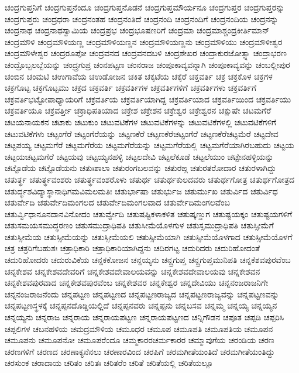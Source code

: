 {ಚಂದ್ರಗುಪ್ತನಿಗೆ
ಚಂದ್ರಗುಪ್ತನೆಂದೂ
ಚಂದ್ರಗುಪ್ತನೊಡನೆ
ಚಂದ್ರಗುಪ್ತಮೌರ್ಯನೂ
ಚಂದ್ರಗುಪ್ತರ
ಚಂದ್ರಗುಪ್ತರನ್ನು
ಚಂದ್ರಗುಪ್ತರು
ಚಂದ್ರಧರಾ
ಚಂದ್ರನಂತಹ
ಚಂದ್ರನಂತಿದೆ
ಚಂದ್ರನಂದಿ
ಚಂದ್ರನಂದಿಗೆ
ಚಂದ್ರನಂದಿಯ
ಚಂದ್ರನನ್ನು
ಚಂದ್ರನಾಥ
ಚಂದ್ರನಾಥಸ್ವಾಮಿಯ
ಚಂದ್ರಪ್ರಭ
ಚಂದ್ರಭೂಷಣರಿಗೆ
ಚಂದ್ರಮಾ
ಚಂದ್ರಮಾಶ್ಚಂದ್ರಕೀರ್ತಿಮಾನ್
ಚಂದ್ರಮೌಳಿ
ಚಂದ್ರಮೌಳಿಯಣ್ಣ
ಚಂದ್ರಮೌಳಿಯಣ್ಣನ
ಚಂದ್ರಮೌಳಿಯಣ್ಣನು
ಚಂದ್ರಮೌಳಿಯು
ಚಂದ್ರಮೌಳೀಶ್ವರ
ಚಂದ್ರಮೌಳೇಶ್ವರ
ಚಂದ್ರರೂಪೋ
ಚಂದ್ರವನದ
ಚಂದ್ರವನದಬಳಿ
ಚಂದ್ರಶೇಖರ
ಚಂದ್ರಾಕುರಜೋತ್ಸ್ನಾ
ಚಂದ್ರಾಭರಣ
ಚಂದ್ರೊಬ್ಬಲಬ್ಬೆಯನ್ನು
ಚಂದ್ರ್ರಗುಪ್ರ
ಚಂನಪಟ್ಟಣ
ಚಂನರಾಜ
ಚಂಪೂಕಾವ್ಯವನ್ನಾಗಿ
ಚಂಪೂಕಾವ್ಯವನ್ನು
ಚಂಬಲ್ಲೀಪುರ
ಚಂಬಿನ
ಚಂಮಟಿ
ಚಉಗಾವೆಯ
ಚಉಡೋಜನ
ಚಕಿತ
ಚಕ್ಕಟೆಯ
ಚಕ್ಕೆರೆ
ಚಕ್ತವರ್ತಿ
ಚಕ್ರ
ಚಕ್ರಕೊಳ
ಚಕ್ರಗಳ
ಚಕ್ರಗೊಟ್ಟ
ಚಕ್ರಗೊಟ್ಟಮು
ಚಕ್ರದ
ಚಕ್ರವರ್ತಿ
ಚಕ್ರವರ್ತಿಗಳ
ಚಕ್ರವರ್ತಿಗಳಿಗೆ
ಚಕ್ರವರ್ತಿಗಳು
ಚಕ್ರವರ್ತಿಗೆ
ಚಕ್ರವರ್ತಿಭಟ್ಟೋಪಾಧ್ಯಾಯರಿಗೆ
ಚಕ್ರವರ್ತಿಯ
ಚಕ್ರವರ್ತಿಯಾಗಿದ್ದ
ಚಕ್ರವರ್ತಿಯಾದ
ಚಕ್ರವರ್ತಿಯಿಂದ
ಚಕ್ರವರ್ತಿಯು
ಚಕ್ರವರ್ತಿಯೂ
ಚಕ್ರವರ್ತ್ತೀ
ಚಕ್ರಾಧಿಪತಿಯಾದ
ಚಕ್ರೇಶ
ಚಕ್ರೇಶನ
ಚಕ್ರೇಶ್ವರ
ಚಕ್ರೇಶ್ವರನ
ಚಕ್ಷುಷೇ
ಚಟಮಗೆರೆ
ಚಟಯನಾಯಕನ
ಚಟಾಕು
ಚಟುಕುಂ
ಚಟುವಟಿಕೆಗಳ
ಚಟುವಟಿಕೆಗಳನ್ನು
ಚಟುವಟಿಕೆಗಳಲ್ಲಿ
ಚಟುವಟಿಕೆಗಳಿಗೆ
ಚಟುವಟಿಕೆಗಳು
ಚಟ್ಟಂಗೆರೆ
ಚಟ್ಟಂಗೆರೆಯನ್ನು
ಚಟ್ಟಣಕೆರೆ
ಚಟ್ಟಣಕೆರೆಚಟ್ಟಂಗೆರೆ
ಚಟ್ಟಣಕೆರೆಚಟ್ಟಮೆರೆ
ಚಟ್ಟದೇವ
ಚಟ್ಟಪಯ್ಯ
ಚಟ್ಟಮಗೆರೆ
ಚಟ್ಟಮಗೆರೆಯ
ಚಟ್ಟಮಗೆರೆಯನ್ನು
ಚಟ್ಟಮಗೆರೆಯಲ್ಲಿ
ಚಟ್ಟಮಗೆರೆಯಾಗಿರಬಹುದು
ಚಟ್ಟಯ
ಚಟ್ಟಯಚಟ್ಟಮಗೆರೆ
ಚಟ್ಟಯವು
ಚಟ್ಟಯ್ಯನಹಳ್ಳಿ
ಚಟ್ಟಲದೇವಿ
ಚಟ್ಟಲೆಕೂಡೆ
ಚಟ್ಟಲೆಯುಂ
ಚಟ್ಟೇನಹಳ್ಳಿಯನ್ನು
ಚಟ್ಟೊಡೆಯ
ಚಟ್ಟೊಡೆಯನು
ಚತುಃಶಾಲಾ
ಚತುರಂಗಬಲವನ್ನು
ಚತುರಙ್ಗ
ಚತುರತರೋದಾರ
ಚತುರಳಾಗಿದ್ದು
ಚತುರ್ತ್ಥ
ಚತುರ್ತ್ಥವಂಶರು
ಚತುರ್ತ್ಥವಂಶರೊಳು
ಚತುರ್ಥ
ಚತುರ್ಥಕುಲದವರು
ಚತುರ್ಥಗೋತ್ರ
ಚತುರ್ಥಗೋತ್ರದ
ಚತುರ್ದ್ಧಶವಿದ್ಯಾಸ್ಥಾನಾಧಿಗಮವಿಮಲಮತಿಃ
ಚತುರ್ಭಾಷಾ
ಚತುರ್ಭುಜ
ಚತುರ್ಮುಖ
ಚತುರ್ವಿದ
ಚತುರ್ವಿಧ
ಚತುರ್ವೇದಿ
ಚತುರ್ವೇದಿಮಂಗಲದ
ಚತುರ್ವೇದಿಮಂಗಲವಾದ
ಚತುರ್ವೇದಿಮಂಗಲವೆಂಬ
ಚತುರ್ವ್ವಿಧಾನೂನದಾನವಿನೋದಂ
ಚತುರ್ವ್ವೇದಿ
ಚತುಷಷ್ಟಿಕಳಾಕಳಿತ
ಚತುಷ್ಕಣ್ಡುಗ
ಚತುಷ್ಟಯಕ್ಕಂ
ಚತುಷ್ಟಯಗಳಿಗೆ
ಚತುಸಮಯಸಮುದ್ಧರಣಂ
ಚತುಸಮುದ್ರಾಧಿಪತಿ
ಚತುಸೀಮೆಯೊಳಗುಳ
ಚತುಸ್ಸಮುದ್ರಾಧಿಪತಿ
ಚತುಸ್ಸೀಮೆಗೆ
ಚತುಸ್ಸೀಮೆಯ
ಚತುಸ್ಸೀಮೆಯನ್ನು
ಚತುಸ್ಸೀಮೆಯಲಿ
ಚತುಸ್ಸೀಮೆಯಾಗಿ
ಚತುಸ್ಸೀಮೆಯೊಳಗಾದ
ಚತುಸ್ಸೀಮೆಯೊಳಗೆ
ಚತ್ರ
ಚತ್ರರಿಗೆಬಹುಶಃ
ಚತ್ರಾಧಿಕಾರಿ
ಚತ್ರಾಧಿಕಾರಿಯಾಗಿದ್ದನು
ಚದಿರಗಟ್ಟ
ಚದುರಿದರು
ಚದುರಿಹೋದಂತೆ
ಚದುರಿಹೋದರು
ಚದುರುವಿಕೆಯ
ಚನ್ದಕಕೋಜನ
ಚನ್ದಯ್ಯನು
ಚನ್ದ್ರಗುಪ್ತ
ಚನ್ದ್ರಗುಪ್ತಮುನಿಪತಿ
ಚನ್ನಕೆಶವಪುರವೆಂಬ
ಚನ್ನಕೇಶವ
ಚನ್ನಕೇಶವದೇವರಿಗೆ
ಚನ್ನಕೇಶವದೇವಾಲಯವನ್ನು
ಚನ್ನಕೇಶವದೇವಾಲಯವು
ಚನ್ನಕೇಶವನ
ಚನ್ನಕೇಶವಪುರವಾದ
ಚನ್ನಕೇಶವಪುರವೆಂಬ
ಚನ್ನಕೇಶವರ
ಚನ್ನಕೇಶ್ವರ
ಚನ್ನದೇವಿಯು
ಚನ್ನನಂಜರಾಜನಿಗೇ
ಚನ್ನನಂಜರಾಜನೆಂದು
ಚನ್ನಪಟ್ಟಣ
ಚನ್ನಪಟ್ಟಣದ
ಚನ್ನಪಟ್ಟಣರಾಜ್ಯದ
ಚನ್ನಪಟ್ಟಣರಾಜ್ಯವನ್ನು
ಚನ್ನಪಟ್ಟಣವನ್ನು
ಚನ್ನಪಟ್ಟಣಸ್ಥಳಕ್ಕೆ
ಚನ್ನಪ್ಪನದೊಡ್ಡಿಯಲ್ಲಿದೆ
ಚನ್ನಪ್ಪನವರು
ಚನ್ನಪ್ಪನು
ಚನ್ನಬಸವ
ಚನ್ನಮ್ಮ
ಚನ್ನಯ್ಯ
ಚನ್ನಯ್ಯನ
ಚನ್ನಯ್ಯನು
ಚನ್ನರಾಜ
ಚನ್ನರಾಯ
ಚನ್ನರಾಯಪಟ್ಟಣ
ಚನ್ನರಾಯಪಟ್ಟಣದ
ಚನ್ನಿಗೌಡನ
ಚಪೂತ
ಚಪ್ಪಡಿ
ಚಪ್ಪರಿಸಿ
ಚಪ್ಪಲಿಗಳ
ಚಬನಹಳಿಯ
ಚಮದ್ರಮೌಳಿಯ
ಚಮೂಧರ
ಚಮೂಪ
ಚಮೂಪತಿ
ಚಮೂಪತಿಯ
ಚಮೂಪನ
ಚಮೂಪನು
ಚಮೂಪನೋ
ಚಮೂಪರೆಂದೂ
ಚಮ್ಮಕಾರರಚರ್ಮಕಾರರ
ಚಮ್ಮಾವುಗೆಯ
ಚರಂಡಿಯ
ಚರಣ
ಚರಣಗಳಿಗೆ
ಚರಣದ
ಚರಣಾಕ್ಯನೆನಲು
ಚರಣಾರವಿಂದ
ಚರಪಿಗೆ
ಚರಮಗೀತೆಯಂತಿದೆ
ಚರಮಗೀತೆಯಂತಿದ್ದು
ಚರಸುಂಕ
ಚರಾದಾಯ
ಚರಿತಂ
ಚರಿತಃ
ಚರಿತರೆಂ
ಚರಿತೆ
ಚರಿತೆಯಲ್ಲಿ
ಚರಿತೆಯಲ್ಲೂ
}
